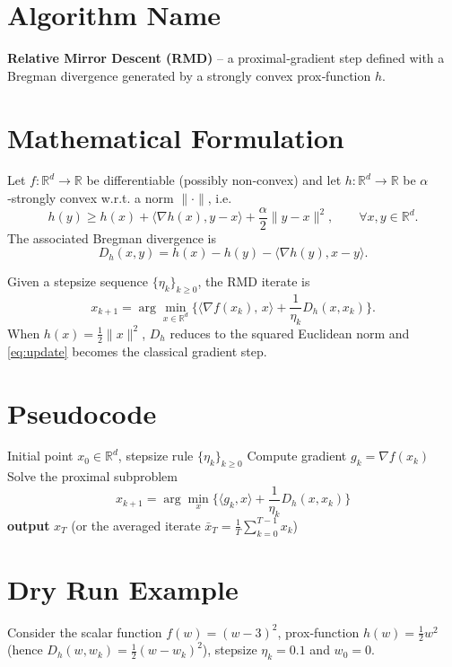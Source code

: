 \documentclass{article}
\newcommand{\Breg}{D_{h}}
\newcommand{\grad}{\nabla}
\newcommand{\R}{\mathbb{R}}
\begin{document}
\section*{Algorithm Name}
\textbf{Relative Mirror Descent (RMD)} – a proximal‑gradient step defined with a Bregman divergence generated by a strongly convex prox‑function $h$.

\section*{Mathematical Formulation}
Let $f:\R^{d}\to\R$ be differentiable (possibly non‑convex) and let $h:\R^{d}\to\R$ be $\alpha$‑strongly convex w.r.t. a norm $\|\cdot\|$, i.e.
\[
h(y)\ge h(x)+\langle \grad h(x),y-x\rangle+\frac{\alpha}{2}\|y-x\|^{2},
\qquad\forall x,y\in\R^{d}.
\]
The associated Bregman divergence is
\[
\Breg(x,y)=h(x)-h(y)-\langle \grad h(y),x-y\rangle .
\]

Given a stepsize sequence $\{\eta_{k}\}_{k\ge0}$, the RMD iterate is
\begin{equation}\label{eq:update}
x_{k+1}= \arg\min_{x\in\R^{d}}
\Big\{ \langle \grad f(x_{k}),\,x\rangle+\frac{1}{\eta_{k}}\Breg(x,x_{k})\Big\}.
\end{equation}
When $h(x)=\frac{1}{2}\|x\|^{2}$, $\Breg$ reduces to the squared Euclidean norm and \eqref{eq:update} becomes the classical gradient step.

\section*{Pseudocode}
\begin{algorithm}[H]
\caption{Relative Mirror Descent}
\begin{algorithmic}[1]
\Require Initial point $x_{0}\in\R^{d}$, stepsize rule $\{\eta_{k}\}_{k\ge0}$
    \State Compute gradient $g_{k}= \grad f(x_{k})$
    \State Solve the proximal subproblem
    \[
        x_{k+1}= \arg\min_{x}\Big\{\langle g_{k},x\rangle+\frac{1}{\eta_{k}}\Breg(x,x_{k})\Big\}
    \]
\EndFor
\State \textbf{output} $x_{T}$ (or the averaged iterate $\bar x_{T}= \frac{1}{T}\sum_{k=0}^{T-1}x_{k}$)
\end{algorithmic}
\end{algorithm}

\section*{Dry Run Example}
Consider the scalar function $f(w)=(w-3)^{2}$, prox‑function $h(w)=\tfrac{1}{2}w^{2}$ (hence $\Breg(w,w_{k})=\tfrac12 (w-w_{k})^{2}$), stepsize $\eta_{k}=0.1$ and $w_{0}=0$.
\end{document}
